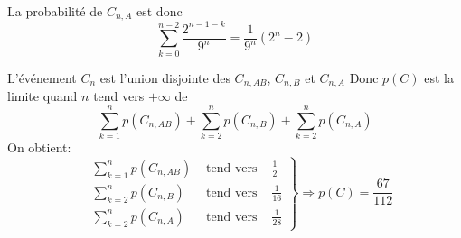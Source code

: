 \begin{enumerate}
\begin{enumerate}
\begin{itemize}
La probabilité de  $C_{n,A}$ est donc 
$$\sum_{k=0}^{n-2}\frac{2^{n-1-k}}{9^n}=\frac{1}{9^n}(2^{n}-2)$$
\end{itemize}

L'événement $C_n$ est l'union disjointe des $C_{n,AB}$, $C_{n,B}$ et $C_{n,A}$ 
Donc $p(C)$ est la limite quand $n$ tend vers $+\infty$ de  
\begin{displaymath}
\sum_{k=1}^n p(C_{n,AB})+\sum_{k=2}^np(C_{n,B})+\sum_{k=2}^np(C_{n,A})  
\end{displaymath}
On obtient:
\begin{displaymath}
\left. 
\begin{aligned}
&\sum_{k=1}^n p(C_{n,AB}) &\text{ tend vers }& \frac 12\\
&\sum_{k=2}^n p(C_{n,B}) &\text{ tend vers }& \frac 1{16}\\
&\sum_{k=2}^n p(C_{n,A}) &\text{ tend vers }& \frac 1{28}
\end{aligned}
\right\rbrace 
\Rightarrow p(C)=\frac {67}{112}
\end{displaymath}

\end{enumerate}
\end{enumerate} 


